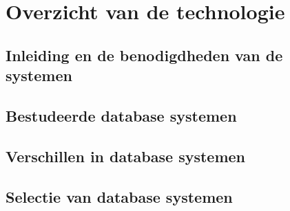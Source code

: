 \chapter{Overzicht van de technologie}

\section{Inleiding en de benodigdheden van de systemen}

\section{Bestudeerde database systemen}

\section{Verschillen in database systemen}

\section{Selectie van database systemen}

